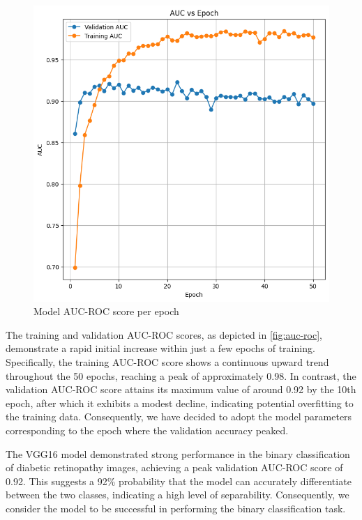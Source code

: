 \begin{figure}[t]
\begin{minipage}{.5\textwidth}
    \includegraphics[scale=0.35]{Images/aucEpoch.png}
    \caption{Model AUC-ROC score per epoch}
    \label{fig:auc-roc}
  \end{minipage}
\end{figure}

The training and validation AUC-ROC scores, as depicted in \autoref{fig:auc-roc}, demonstrate a rapid initial increase within just a few epochs of training. Specifically, the training AUC-ROC score shows a continuous upward trend throughout the 50 epochs, reaching a peak of approximately 0.98. In contrast, the validation AUC-ROC score attains its maximum value of around 0.92 by the 10th epoch, after which it exhibits a modest decline, indicating potential overfitting to the training data. Consequently, we have decided to adopt the model parameters corresponding to the epoch where the validation accuracy peaked.

The VGG16 model demonstrated strong performance in the binary classification of diabetic retinopathy images, achieving a peak validation AUC-ROC score of 0.92. This suggests a 92\% probability that the model can accurately differentiate between the two classes, indicating a high level of separability. Consequently, we consider the model to be successful in performing the binary classification task.

